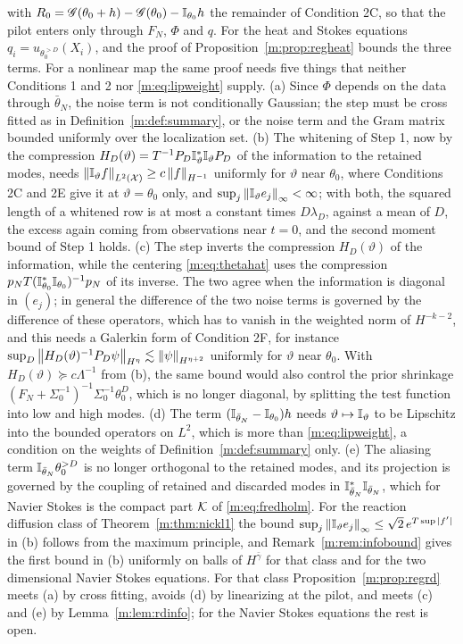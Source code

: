 \begin{remark}
with $R_0=\mathscr{G}(\theta_0+h)-\mathscr{G}(\theta_0)-\mathbb{I}_{\theta_0}h$ the remainder of Condition 2C, so that the pilot enters only through $F_N$, $\Phi$ and $q$. For the heat and Stokes equations $q_i=u_{\theta_0^{>D}}(X_i)$, and the proof of Proposition~\ref{m:prop:regheat} bounds the three terms. For a nonlinear map the same proof needs five things that neither Conditions 1 and 2 nor \eqref{m:eq:lipweight} supply. (a) Since $\Phi$ depends on the data through $\bar\theta_N$, the noise term is not conditionally Gaussian; the step must be cross fitted as in Definition~\ref{m:def:summary}, or the noise term and the Gram matrix bounded uniformly over the localization set. (b) The whitening of Step 1, now by the compression $H_D(\vartheta)=T^{-1}P_D\mathbb{I}^*_\vartheta\mathbb{I}_\vartheta P_D$ of the information to the retained modes, needs $\left\|\mathbb{I}_\vartheta f\right\|_{L^2(\mathcal X)}\ge c\left\|f\right\|_{H^{-1}}$ uniformly for $\vartheta$ near $\theta_0$, where Conditions 2C and 2E give it at $\vartheta=\theta_0$ only, and $\sup_j\left\|\mathbb{I}_\vartheta e_j\right\|_\infty<\infty$; with both, the squared length of a whitened row is at most a constant times $D\lambda_D$, against a mean of $D$, the excess again coming from observations near $t=0$, and the second moment bound of Step 1 holds. (c) The step inverts the compression $H_D(\vartheta)$ of the information, while the centering \eqref{m:eq:thetahat} uses the compression $p_NT(\mathbb{I}^*_{\theta_0}\mathbb{I}_{\theta_0})^{-1}p_N$ of its inverse. The two agree when the information is diagonal in $(e_j)$; in general the difference of the two noise terms is governed by the difference of these operators, which has to vanish in the weighted norm of $H^{-k-2}$, and this needs a Galerkin form of Condition 2F, for instance $\sup_D\left\|H_D(\vartheta)^{-1}P_D\psi\right\|_{H^\eta}\lesssim\left\|\psi\right\|_{H^{\eta+2}}$ uniformly for $\vartheta$ near $\theta_0$. With $H_D(\vartheta)\succeq c\Lambda^{-1}$ from (b), the same bound would also control the prior shrinkage $(F_N+\Sigma_0^{-1})^{-1}\Sigma_0^{-1}\theta_0^D$, which is no longer diagonal, by splitting the test function into low and high modes. (d) The term $(\mathbb{I}_{\bar\theta_N}-\mathbb{I}_{\theta_0})h$ needs $\vartheta\mapsto\mathbb{I}_\vartheta$ to be Lipschitz into the bounded operators on $L^2$, which is more than \eqref{m:eq:lipweight}, a condition on the weights of Definition~\ref{m:def:summary} only. (e) The aliasing term $\mathbb{I}_{\bar\theta_N}\theta_0^{>D}$ is no longer orthogonal to the retained modes, and its projection is governed by the coupling of retained and discarded modes in $\mathbb{I}^*_{\bar\theta_N}\mathbb{I}_{\bar\theta_N}$, which for Navier Stokes is the compact part $\mathcal{K}$ of \eqref{m:eq:fredholm}. For the reaction diffusion class of Theorem~\ref{m:thm:nickl1} the bound $\sup_j\left\|\mathbb{I}_\vartheta e_j\right\|_\infty\le\sqrt2\,e^{T\sup|f'|}$ in (b) follows from the maximum principle, and Remark~\ref{m:rem:infobound} gives the first bound in (b) uniformly on balls of $H^{\bar\gamma}$ for that class and for the two dimensional Navier Stokes equations. For that class Proposition~\ref{m:prop:regrd} meets (a) by cross fitting, avoids (d) by linearizing at the pilot, and meets (c) and (e) by Lemma~\ref{m:lem:rdinfo}; for the Navier Stokes equations the rest is open.
\end{remark}

